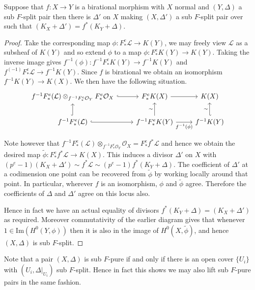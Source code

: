 \documentclass[a4paper,12pt]{book}
\newcommand{\Fe}{F^{e}_{*}}
\newcommand{\ox}{\mathcal{O}_{X}}
\begin{document}
\begin{lemma}\label{F-pullback}
	Suppose that $f:X \to Y$ is a birational morphism with $X$ normal and $(Y,\Delta)$ a sub $F$-split pair then there is $\Delta'$ on $X$ making $(X,\Delta')$ a sub $F$-split pair over such that $(K_{X}+\Delta')=f^{*}(K_{Y}+\Delta)$.  
\end{lemma}
\begin{proof}
	
	Take the corresponding map $\phi: \Fe\mathcal{L} \to K(Y)$, we may freely view $\mathcal{L}$ as a subsheaf of $K(Y)$ and so extend $\phi$ to a map $\phi: \Fe K(Y) \to K(Y)$. Taking the inverse image gives $f^{-1}(\phi): f^{-1}\Fe K(Y) \to f^{-1}K(Y)$ and $f^(-1)\Fe \mathcal{L} \to f^{-1}K(Y)$. Since $f$ is birational we obtain an isomorphism $f^{-1}K(Y) \to K(X)$. We then have the following situation.
	\[\begin{tikzcd}
	f^{-1}\Fe(\mathcal{L}) \otimes_{f^{-1}\Fe\mathcal{O}_{Y}}\Fe\ox \arrow[r, hook] & \Fe K(X) \arrow[r]                                          & K(X)                                \\
	f^{-1}\Fe(\mathcal{L}) \arrow[r, hook] \arrow[u, hook]                       & f^{-1}\Fe K(Y) \arrow[r, "f^{-1}(\phi)"'] \arrow[u, "\sim"] & f^{-1}K(Y) \arrow[u, "\sim", hook']
	\end{tikzcd}\]
	
	Note however that $f^{-1}\Fe(\mathcal{L}) \otimes_{f^{-1}\Fe\mathcal{O}_{Y}}\ox= \Fe f^{*}\mathcal{L}$ and hence we obtain the desired map $\tilde{\phi}: \Fe f^{*}\mathcal{L} \to K(X)$. This induces a divisor $\Delta'$ on $X$ with $(p^{e}-1)(K_{X}+\Delta') \sim f^{*}\mathcal{L} \sim (p^{e}-1)f^{*}(K_{Y}+\Delta)$. The coefficient of $\Delta'$ at a codimension one point can be recovered from $\tilde{\phi}$ by working locally around that point. In particular, wherever $f$ is an isomorphism, $\phi$ and $\tilde{\phi}$ agree. Therefore the coefficients of $\Delta$ and $\Delta'$ agree on this locus also.
	
	Hence in fact we have an actual equality of divisors $f^{*}(K_{Y}+\Delta)=(K_{X}+\Delta')$ as required. Moreover commutativity of the earlier diagram gives that whenever $1 \in \text{Im}(H^{0}(Y,\phi))$ then it is also in the image of $H^{0}(X,\tilde{\phi})$, and hence $(X,\Delta)$ is sub $F$-split.
\end{proof}

Note that a pair $(X,\Delta)$ is sub $F$-pure if and only if there is an open cover $\{U_{i}\}$ with $(U_{i},\Delta|_{U_{i}})$ sub $F$-split. Hence in fact this shows we may also lift sub $F$-pure pairs in the same fashion. 
\end{document}
